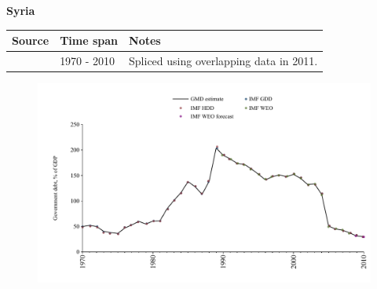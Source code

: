 \documentclass[12pt,a4paper,landscape]{article}
\begin{document}
\begin{adjustbox}{max totalsize={\paperwidth}{\paperheight},center}
\begin{minipage}[t][\textheight][t]{\textwidth}
\vspace*{0.5cm}
{}
\begin{center}
{\Large\bfseries Syria}
\end{center}
\vspace{0.5cm}
\begin{table}[H]
\centering
\small
\begin{tabular}{|l|l|l|}
\hline
\textbf{Source} & \textbf{Time span} & \textbf{Notes} \\
\hline
\rowcolor{white}\cite{IMF_GDD}& 1970 - 2010 &Spliced using overlapping data in 2011.\\
\hline
\end{tabular}
\end{table}
\begin{figure}[H]
\centering
\includegraphics[width=\textwidth,height=0.6\textheight,keepaspectratio]{graphs/SYR_govdebt_GDP.pdf}
\end{figure}
\end{minipage}
\end{adjustbox}
\end{document}
